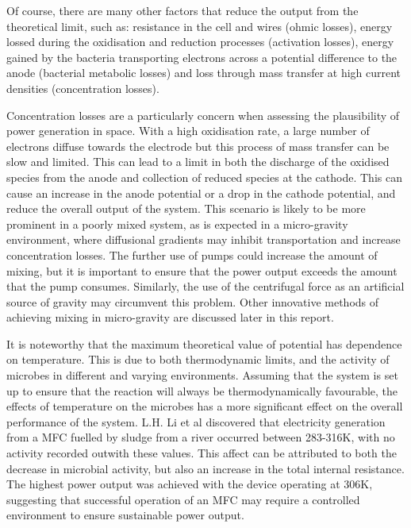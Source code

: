 \documentclass[12pt]{article}
\begin{document}
Of course, there are many other factors that reduce the output from the theoretical limit, such as: resistance in the cell and wires (ohmic losses), energy lossed during the oxidisation and reduction processes (activation losses), energy gained by the bacteria transporting electrons across a potential difference to the anode (bacterial metabolic losses) and loss through mass transfer at high current densities (concentration losses).\cite{logan2006microbial}

Concentration losses are a particularly concern when assessing the plausibility of power generation in space. With a high oxidisation rate, a large number of electrons diffuse towards the electrode but this process of mass transfer can be slow and limited. This can lead to a limit in both the discharge of the oxidised species from the anode and collection of reduced species at the cathode. This can cause an increase in the anode potential or a drop in the cathode potential, and reduce the overall output of the system. This scenario is likely to be more prominent in a poorly mixed system, as is expected in a micro-gravity environment, where diffusional gradients may inhibit transportation and increase concentration losses. The further use of pumps could increase the amount of mixing, but it is important to ensure that the power output exceeds the amount that the pump consumes. Similarly, the use of the centrifugal force as an artificial source of gravity may circumvent this problem. Other innovative methods of achieving mixing in micro-gravity are discussed later in this report. 

It is noteworthy that the maximum theoretical value of potential has dependence on temperature. This is due to both thermodynamic limits, and the activity of microbes in different and varying environments. Assuming that the system is set up to ensure that the reaction will always be thermodynamically favourable, the effects of temperature on the microbes has a more significant effect on the overall performance of the system. L.H. Li et al \cite{li2013effect} discovered that electricity generation from a MFC fuelled by sludge from a river occurred between 283-316K, with no activity recorded outwith these values. This affect can be attributed to both the decrease in microbial activity, but also an increase in the total internal resistance. The highest power output was achieved with the device operating at 306K, suggesting that successful operation of an MFC may require a controlled environment to ensure sustainable power output.
\end{document}
